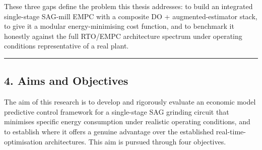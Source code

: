 \documentclass[
  14pt,
]{extarticle}
\begin{document}
These three gaps define the problem this thesis addresses: to build an
integrated single-stage SAG-mill EMPC with a composite DO +
augmented-estimator stack, to give it a modular energy-minimising cost
function, and to benchmark it honestly against the full RTO/EMPC
architecture spectrum under operating conditions representative of a
real plant.

\begin{center}\rule{0.5\linewidth}{0.5pt}\end{center}

\subsection{4. Aims and Objectives}\label{aims-and-objectives}

The aim of this research is to develop and rigorously evaluate an
economic model predictive control framework for a single-stage SAG
grinding circuit that minimises specific energy consumption under
realistic operating conditions, and to establish where it offers a
genuine advantage over the established real-time-optimisation
architectures. This aim is pursued through four objectives.
\end{document}
